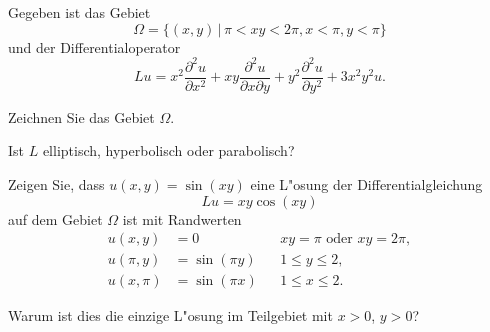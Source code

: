 Gegeben ist das Gebiet
\[
\Omega=\{
(x,y)\,|\,\pi < xy < 2\pi, x < \pi,y < \pi
\}
\]
und der Differentialoperator
\[
Lu=
x^2\frac{\partial^2u}{\partial x^2}
+xy\frac{\partial^2u}{\partial x\partial y}
+y^2\frac{\partial^2u}{\partial y^2}
+3x^2y^2u.
\]
\begin{teilaufgaben}
\item Zeichnen Sie das Gebiet $\Omega$.
\item Ist $L$ elliptisch, hyperbolisch oder parabolisch?
\item Zeigen Sie, dass $u(x,y)=\sin(xy)$ eine L"osung der
Differentialgleichung
\[
Lu=xy\cos(xy)
\]
auf dem Gebiet $\Omega$ ist mit Randwerten
\begin{align*}
u(x,y)&=0            &&\text{$xy=\pi$ oder $xy=2\pi$},\\
u(\pi,y)&=\sin(\pi y)&&1\le y\le 2,\\
u(x,\pi)&=\sin(\pi x)&&1\le x\le 2.
\end{align*}
\item Warum ist dies die einzige L"osung im Teilgebiet mit $x>0$, $y>0$?
\end{teilaufgaben}

